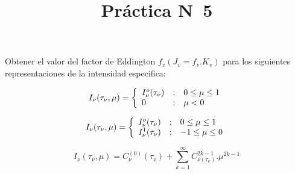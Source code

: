 \documentclass[12pt,spanish,a4paper]{practice}
\begin{document}
    \title{Práctica N\textdegree\ 5}
    \maketitle
    \begin{problem}\label{prob:1}
    Obtener el valor del factor de Eddington $f_{v} (J_{v}=f_{v}.K_{v})$ para los siguientes representaciones de la intensidad especifica:

        \begin{ppart}\label{prob:1:a}
            \begin{equation*}
                I_{\nu}(\tau_{\nu},\mu) = \left\{
                \begin{array}{l c l}
                    I_{\nu}^{o}(\tau_{\nu}) & ; & 0 \leq \mu \leq 1 \\
                    0 & ; &  \mu < 0
                \end{array}
                \right. 
            \end{equation*}
            
        \end{ppart}
        
        \begin{ppart}\label{prob:1:b}
            \begin{equation*}
                I_{\nu}(\tau_{\nu},\mu) = \left\{
                \begin{array}{l c l}
                    I_{\nu}^{o}(\tau_{\nu}) & ; & 0 \leq \mu \leq 1 \\
                    I_{\nu}^{1}(\tau_{\nu}) & ; & -1 \leq \mu \leq 0
                \end{array}
                \right. 
            \end{equation*}
            
        \end{ppart}

        \begin{ppart}\label{prob:1:c}
            \begin{equation*}
                I_{\nu}(\tau_{\nu},\mu) = C_{\nu}^{(0)}(\tau_{\nu}) + \sum_{k=1}^{\infty} C_{\nu (\tau_{\nu})}^{2k-1} . \mu^{2k-1}
            \end{equation*}
        \end{ppart}


\end{problem}
\end{document}
